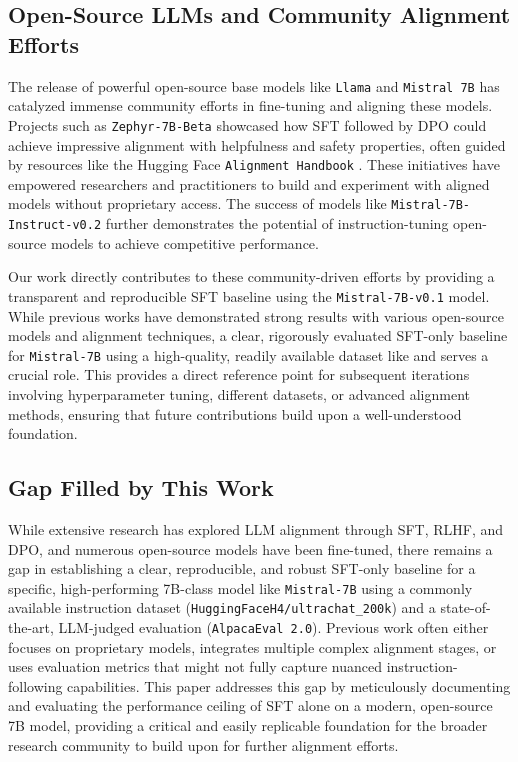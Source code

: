 \documentclass[11pt]{article}
\begin{document}
\subsection{Open-Source LLMs and Community Alignment Efforts}
The release of powerful open-source base models like \texttt{Llama} \cite{touvron2023llama, touvron2023llama_2} and \texttt{Mistral 7B} \cite{jiang2023mistral} has catalyzed immense community efforts in fine-tuning and aligning these models. Projects such as \texttt{Zephyr-7B-Beta} \cite{sft_and_dpo_zephyr} showcased how SFT followed by DPO could achieve impressive alignment with helpfulness and safety properties, often guided by resources like the Hugging Face \texttt{Alignment Handbook} \cite{alignment_handbook}. These initiatives have empowered researchers and practitioners to build and experiment with aligned models without proprietary access. The success of models like \texttt{Mistral-7B-Instruct-v0.2} further demonstrates the potential of instruction-tuning open-source models to achieve competitive performance.

Our work directly contributes to these community-driven efforts by providing a transparent and reproducible SFT baseline using the \texttt{Mistral-7B-v0.1} model. While previous works have demonstrated strong results with various open-source models and alignment techniques, a clear, rigorously evaluated SFT-only baseline for \texttt{Mistral-7B} using a high-quality, readily available dataset like  and  serves a crucial role. This provides a direct reference point for subsequent iterations involving hyperparameter tuning, different datasets, or advanced alignment methods, ensuring that future contributions build upon a well-understood foundation.

\subsection{Gap Filled by This Work}
While extensive research has explored LLM alignment through SFT, RLHF, and DPO, and numerous open-source models have been fine-tuned, there remains a gap in establishing a clear, reproducible, and robust SFT-only baseline for a specific, high-performing 7B-class model like \texttt{Mistral-7B} using a commonly available instruction dataset (\texttt{HuggingFaceH4/ultrachat\_200k}) and a state-of-the-art, LLM-judged evaluation (\texttt{AlpacaEval 2.0}). Previous work often either focuses on proprietary models, integrates multiple complex alignment stages, or uses evaluation metrics that might not fully capture nuanced instruction-following capabilities. This paper addresses this gap by meticulously documenting and evaluating the performance ceiling of SFT alone on a modern, open-source 7B model, providing a critical and easily replicable foundation for the broader research community to build upon for further alignment efforts.
\end{document}
